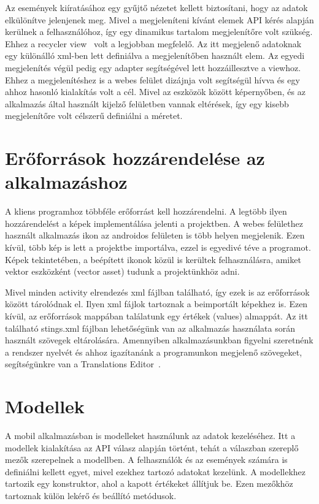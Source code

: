 \documentclass[
]{thesis-ekf}
\theoremstyle{definition}
\theoremstyle{remark}
\begin{document}
	Az események kiíratásához egy gyűjtő nézetet kellett biztosítani, hogy az adatok elkülönítve jelenjenek meg. Mivel a megjeleníteni kívánt elemek API kérés alapján kerülnek a felhasználóhoz, így egy dinamikus tartalom megjelenítőre volt szükség. Ehhez a recycler view~\cite{android_recycler} volt a legjobban megfelelő. Az itt megjelenő adatoknak egy különálló xml-ben lett definiálva a megjelenítőben használt elem. Az egyedi megjelenítés végül pedig egy adapter segítségével lett hozzáillesztve a viewhoz. Ehhez a megjelenítéshez is a webes felület dizájnja volt segítségül hívva és egy ahhoz hasonló kialakítás volt a cél. Mivel az eszközök között képernyőben, és az alkalmazás által használt kijelző felületben vannak eltérések, így egy kisebb megjelenítőre volt célszerű definiálni a méretet.
	
	\section{Erőforrások hozzárendelése az alkalmazáshoz}
	A kliens programhoz többféle erőforrást kell hozzárendelni. A legtöbb ilyen hozzárendelést a képek implementálása jelenti a projektben. A webes felülethez használt alkalmazás ikon az androidos felületen is több helyen megjelenik. Ezen kívül, több kép is lett a projektbe importálva, ezzel is egyedivé téve a programot. Képek tekintetében, a beépített ikonok közül is kerültek felhasználásra, amiket vektor eszközként (vector asset) tudunk a projektünkhöz adni.
	
	Mivel minden activity elrendezés xml fájlban található, így ezek is az erőforrások között tárolódnak el. Ilyen xml fájlok tartoznak a beimportált képekhez is. Ezen kívül, az erőforrások mappában találatunk egy értékek (values) almappát. Az itt található stings.xml fájlban lehetőségünk van az alkalmazás használata során használt szövegek eltárolására. Amennyiben alkalmazásunkban figyelni szeretnénk a rendszer nyelvét és ahhoz igazítanánk a programunkon megjelenő szövegeket, segítségünkre van a Translations Editor~\cite{android_translations}. 
	
	\section{Modellek}
	A mobil alkalmazásban is modelleket használunk az adatok kezeléséhez. Itt a modellek kialakítása az API válasz alapján történt, tehát a válaszban szereplő mezők szerepelnek a modellben. A felhasználók és az események számára is definiálni kellett egyet, mivel ezekhez tartozó adatokat kezelünk. 
	A modellekhez tartozik egy konstruktor, ahol a kapott értékeket állítjuk be. Ezen mezőkhöz tartoznak külön lekérő és beállító metódusok.
	
\end{document}
